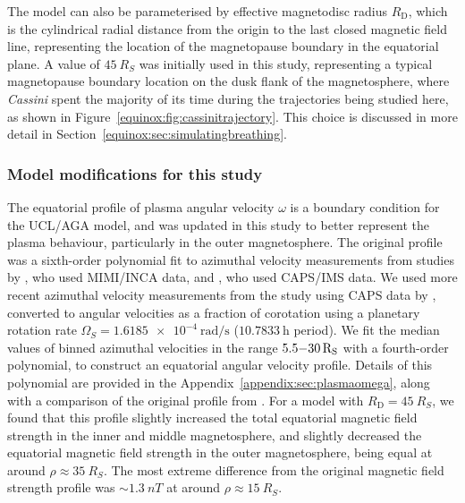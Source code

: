 The model can also be parameterised by effective magnetodisc radius $R_\mathrm{D}$, which is the cylindrical radial distance from the origin to the last closed magnetic field line, representing the location of the magnetopause boundary in the equatorial plane. A value of $\SI{45}{R_S}$ was initially used in this study, representing a typical magnetopause boundary location on the dusk flank of the magnetosphere, where \textit{Cassini} spent the majority of its time during the trajectories being studied here, as shown in Figure~\ref{equinox:fig:cassinitrajectory}. This choice is discussed in more detail in Section~\ref{equinox:sec:simulatingbreathing}.

\subsubsection{Model modifications for this study}\label{equinox:sec:modmodifications}
The equatorial profile of plasma angular velocity $\omega$ is a boundary condition for the UCL/AGA model, and was updated in this study to better represent the plasma behaviour, particularly in the outer magnetosphere. The original profile was a sixth-order polynomial fit to azimuthal velocity measurements from studies by \citet{kane2008}, who used MIMI/INCA data, and \citet{wilson2008}, who used CAPS/IMS data. We used more recent azimuthal velocity measurements from the study using CAPS data by \citet{wilson2017}, converted to angular velocities as a fraction of corotation using a planetary rotation rate $\Omega_S = \SI{1.6185e-4}{\radian\per\second}$ ($\SI{10.7833}{\hour}$ period). We fit the median values of binned azimuthal velocities in the range $5.5{\--}\SI{30}{R_S}$ with a fourth-order polynomial, to construct an equatorial angular velocity profile. Details of this polynomial are provided in the Appendix~\ref{appendix:sec:plasmaomega}, along with a comparison of the original profile from \citet{achilleos2010a}. For a model with $R_\mathrm{D} = \SI{45}{R_S}$, we found that this profile slightly increased the total equatorial magnetic field strength in the inner and middle magnetosphere, and slightly decreased the equatorial magnetic field strength in the outer magnetosphere, being equal at around $\rho\approx\SI{35}{R_S}$. The most extreme difference from the original magnetic field strength profile was ${\sim}\SI{1.3}{nT}$ at around $\rho\approx\SI{15}{R_S}$.

